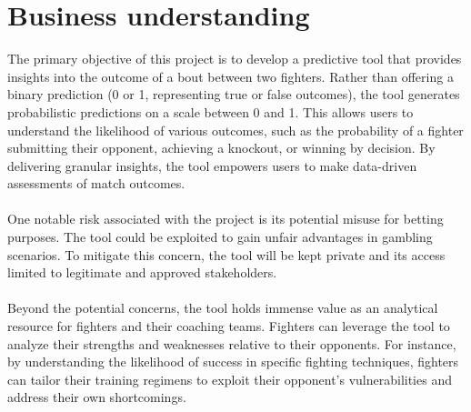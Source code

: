 \documentclass{article}
\begin{document}
	\section{Business understanding}
	The primary objective of this project is to develop a predictive tool that provides insights into the outcome of a bout between two fighters. 
	Rather than offering a binary prediction (0 or 1, representing true or false outcomes), the tool generates probabilistic predictions on a scale 
	between 0 and 1. This allows users to understand the likelihood of various outcomes, such as the probability of a fighter submitting their opponent, 
	achieving a knockout, or winning by decision. By delivering granular insights, the tool empowers users to make data-driven assessments of match 
	outcomes.\\\\
	One notable risk associated with the project is its potential misuse for betting purposes. The tool could be exploited to gain unfair advantages in gambling
	scenarios. To mitigate this concern, the tool will be kept private and its access limited to legitimate and approved stakeholders.\\\\
	Beyond the potential concerns, the tool holds immense value as an analytical resource for fighters and their coaching teams. Fighters can leverage
	the tool to analyze their strengths and weaknesses relative to their opponents. For instance, by understanding the likelihood of success in 
	specific fighting techniques, fighters can tailor their training regimens to exploit their opponent's vulnerabilities and address their own 
	shortcomings.
\end{document}
